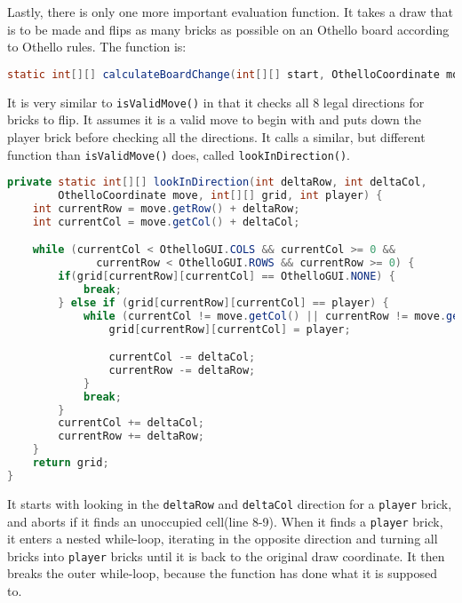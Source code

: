 \documentclass{article}
\begin{document}
Lastly, there is only one more important evaluation function. It takes a draw that is to be made and flips
as many bricks as possible on an Othello board according to Othello rules. The function is:

\begin{lstlisting}[language=Java]
static int[][] calculateBoardChange(int[][] start, OthelloCoordinate move, int player)
\end{lstlisting}

It is very similar to \verb|isValidMove()| in that it checks all 8 legal directions for bricks to flip.
It assumes it is a valid move to begin with and puts down the player brick before checking all the directions.
It calls a similar, but different function than \verb|isValidMove()| does, called \verb|lookInDirection()|.
\newpage

\begin{lstlisting}[language=Java]
private static int[][] lookInDirection(int deltaRow, int deltaCol,
        OthelloCoordinate move, int[][] grid, int player) {
    int currentRow = move.getRow() + deltaRow;
    int currentCol = move.getCol() + deltaCol;

    while (currentCol < OthelloGUI.COLS && currentCol >= 0 &&
              currentRow < OthelloGUI.ROWS && currentRow >= 0) {
        if(grid[currentRow][currentCol] == OthelloGUI.NONE) {
            break;
        } else if (grid[currentRow][currentCol] == player) {
            while (currentCol != move.getCol() || currentRow != move.getRow()) {
                grid[currentRow][currentCol] = player;

                currentCol -= deltaCol;
                currentRow -= deltaRow;
            }
            break;
        }
        currentCol += deltaCol;
        currentRow += deltaRow;
    }
    return grid;
}
\end{lstlisting}

It starts with looking in the \verb|deltaRow| and \verb|deltaCol| direction for a \verb|player| brick,
and aborts if it finds an unoccupied cell(line 8-9). When it finds a \verb|player| brick, it enters
a nested while-loop, iterating in the opposite direction and turning all bricks into \verb|player| bricks until
it is back to the original draw coordinate. It then breaks the outer while-loop, because the function has done
what it is supposed to.



\end{document}
